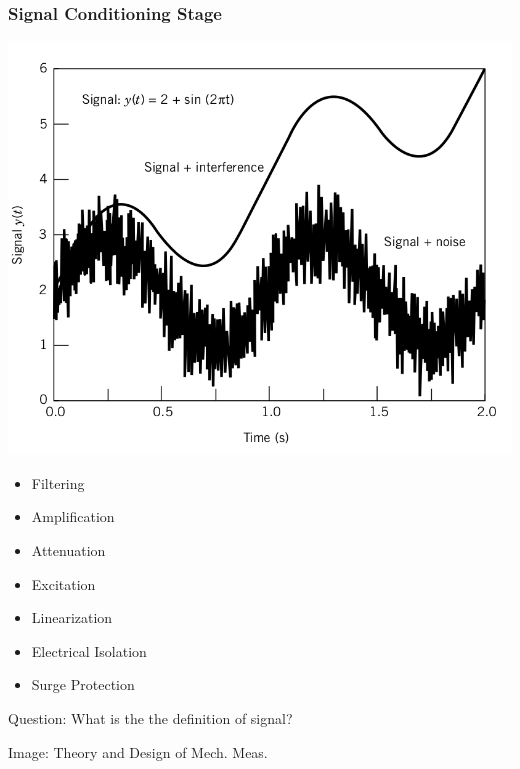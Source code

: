 \documentclass[fleqn]{beamer} %
\begin{document}
			\begin{frame}
				\frametitle{Signal Conditioning Stage}

				\begin{multicols}{2}
				\includegraphics[scale=0.18]{images/signal_noise.png}

				\begin{itemize}
				\item Filtering
				\item Amplification
				\item Attenuation
				\item Excitation 
				\item Linearization
				\item Electrical Isolation
				\item Surge Protection
				\end{itemize}

				\end{multicols}

				Question: What is the the definition of {\BL signal}? \vspc

				{\tiny Image: Theory and Design of Mech. Meas.}
			\end{frame}
\end{document}
